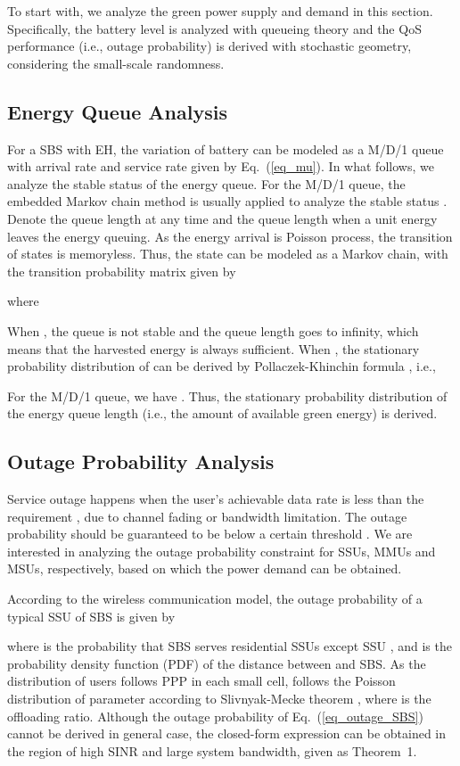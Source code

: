 \documentclass[12pt, draftclsnofoot,onecolumn]{IEEEtran}
\begin{document}
To start with, we analyze the green power supply and demand in this section.
Specifically, the battery level is analyzed with queueing theory and the QoS performance (i.e., outage probability) is derived with stochastic geometry, considering the small-scale randomness.
 

\subsection{Energy Queue Analysis}
For a SBS with EH, the variation of battery can be modeled as a M/D/1 queue with arrival rate  and service rate  given by Eq.~(\ref{eq_mu}).
In what follows, we analyze the stable status of the energy queue.
For the M/D/1 queue, the embedded Markov chain method is usually applied to analyze the stable status \cite{MD1_queue}.
Denote  the queue length at any time and  the queue length when a unit energy leaves the energy queuing.
As the energy arrival is Poisson process, the transition of states  is memoryless.
Thus, the state  can be modeled as a Markov chain, with the transition probability matrix given by

where


When , the queue is not stable and the queue length goes to infinity, which means that the harvested energy is always sufficient.
When , the stationary probability distribution of  can be derived by Pollaczek-Khinchin formula \cite{MD1_queue}, i.e.,

For the M/D/1 queue, we have  \cite{MD1_queue}.
Thus, the stationary probability distribution of the energy queue length (i.e., the amount of available green energy) is derived.

\subsection{Outage Probability Analysis}

Service outage happens when the user's achievable data rate is less than the requirement , due to channel fading or bandwidth limitation.
The outage probability should be guaranteed to be below a certain threshold .
We are interested in analyzing the outage probability constraint for SSUs, MMUs and MSUs, respectively, based on which the power demand can be obtained.

According to the wireless communication model, the outage probability of a typical SSU  of SBS is given by
        
where  is the probability that SBS serves  residential SSUs except SSU , and  is the probability density function (PDF) of the distance between  and SBS.
As the distribution of users follows PPP in each small cell,  follows the Poisson distribution of parameter  according to Slivnyak-Mecke theorem \cite{Slivnyak_theorem}, where  is the offloading ratio.
Although the outage probability of Eq.~(\ref{eq_outage_SBS}) cannot be derived in general case, the closed-form expression can be obtained in the region of high SINR and large system bandwidth, given as Theorem~1.\\
\end{document}
